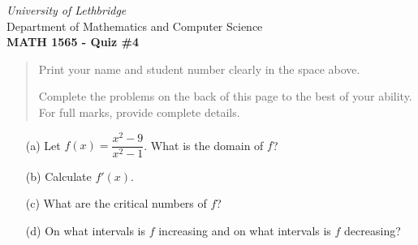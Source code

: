 \documentclass[12pt]{article}
\newcommand{\skipline}{\vspace{12pt}}
\begin{document}
\thispagestyle{empty}
\begin{center}
\emph{University of Lethbridge}\\
Department of Mathematics and Computer Science\\
{\bf MATH 1565 - Quiz \#4}\\
\end{center}



\vspace{0.1in}

\vspace*{\fill}

\begin{quote}
Print your name and student number clearly in the space above. 

\medskip

Complete the problems on the back of this page to the best of your ability.
For full marks, provide complete details.

\medskip

\end{quote}
\newpage
\thispagestyle{empty}
\begin{enumerate}
 \item[(a)] Let $f(x) = \dfrac{x^2-9}{x^2-1}$.  What is the domain of $f$? 
 \vspace{2cm}
 \item[(b)] Calculate $f'(x)$. 
 \vspace{6cm}
 \item[(c)] What are the critical numbers of $f$? 
 \vspace{6cm}
 \item[(d)] On what intervals is $f$ increasing and on what intervals is $f$ decreasing?
\end{enumerate}
\end{document}
